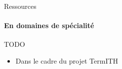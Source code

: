 \begin{frame}{Ressources}\framesubtitle{En domaines de spécialité}
  \begin{alertblock}{TODO}
    \begin{itemize}
      \item{Dans le cadre du projet TermITH}
    \end{itemize}
  \end{alertblock}
\end{frame}

